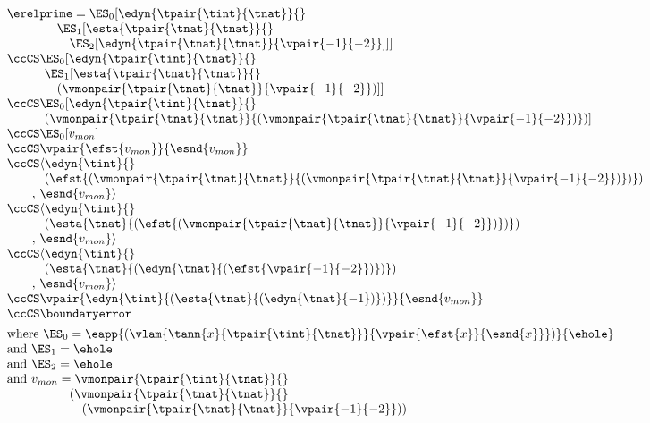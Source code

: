 $\begin{array}{l}
  \erelprime = \ES_0[\edyn{\tpair{\tint}{\tnat}}{}
\\\qquad\quad\quad \ES_1[\esta{\tpair{\tnat}{\tnat}}{}
\\\qquad\quad\quad\quad \ES_2[\edyn{\tpair{\tnat}{\tnat}}{\vpair{-1}{-2}}]]]
\\\ccCS \ES_0[\edyn{\tpair{\tint}{\tnat}}{}
\\\qquad\quad \ES_1[\esta{\tpair{\tnat}{\tnat}}{}
\\\qquad\quad\quad (\vmonpair{\tpair{\tnat}{\tnat}}{\vpair{-1}{-2}})]]
\\\ccCS \ES_0[\edyn{\tpair{\tint}{\tnat}}{}
\\\qquad\quad (\vmonpair{\tpair{\tnat}{\tnat}}{(\vmonpair{\tpair{\tnat}{\tnat}}{\vpair{-1}{-2}})})]
\\\ccCS \ES_0[v_{mon}]
\\\ccCS \vpair{\efst{v_{mon}}}{\esnd{v_{mon}}}
\\\ccCS \langle\edyn{\tint}{}
\\\qquad\quad (\efst{(\vmonpair{\tpair{\tnat}{\tnat}}{(\vmonpair{\tpair{\tnat}{\tnat}}{\vpair{-1}{-2}})})})
\\\qquad ,\,{\esnd{v_{mon}}}\rangle
\\\ccCS \langle\edyn{\tint}{}
\\\qquad\quad (\esta{\tnat}{(\efst{(\vmonpair{\tpair{\tnat}{\tnat}}{\vpair{-1}{-2}})})})
\\\qquad ,\,{\esnd{v_{mon}}}\rangle
\\\ccCS \langle\edyn{\tint}{}
\\\qquad\quad (\esta{\tnat}{(\edyn{\tnat}{(\efst{\vpair{-1}{-2}})})})
\\\qquad ,\,\esnd{v_{mon}}\rangle
\\\ccCS \vpair{\edyn{\tint}{(\esta{\tnat}{(\edyn{\tnat}{{-1}})})}}{\esnd{v_{mon}}}
\\\ccCS \boundaryerror
\\[1ex]
  \mbox{where } \ES_0 = \eapp{(\vlam{\tann{x}{\tpair{\tint}{\tnat}}}{\vpair{\efst{x}}{\esnd{x}}})}{\ehole}
\\\mbox{and } \ES_1 = \ehole
\\\mbox{and } \ES_2 = \ehole
\\\mbox{and } v_{mon} = \vmonpair{\tpair{\tint}{\tnat}}{}
\\\quad\quad\quad\quad\quad (\vmonpair{\tpair{\tnat}{\tnat}}{}
\\\quad\quad\quad\quad\quad\quad (\vmonpair{\tpair{\tnat}{\tnat}}{\vpair{-1}{-2}}))
\end{array}$


